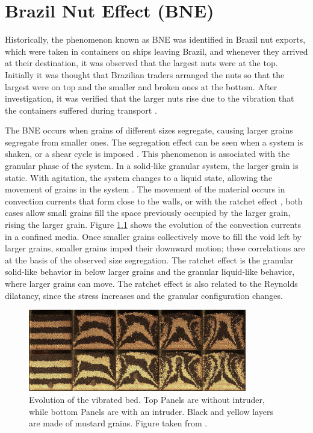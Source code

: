 \chapter{Brazil Nut Effect (BNE)}
\label{chap:BNE}
    Historically, the phenomenon known as BNE was identified in Brazil nut exports, which were taken in containers on ships leaving Brazil, and whenever they arrived at their destination, it was observed that the largest nuts were at the top. Initially it was thought that Brazilian traders arranged the nuts so that the largest were on top and the smaller and broken ones at the bottom. After investigation, it was verified that the larger nuts rise due to the vibration that the containers suffered during transport \cite{Caio-Tese}. 

    The BNE occurs when grains of different sizes segregate, causing larger grains segregate from smaller ones. The segregation effect can be seen when a system is shaken, or a shear cycle is imposed \cite{Granular_Physics}. This phenomenon is associated with the granular phase of the system. In a solid-like granular system, the larger grain is static. With agitation, the system changes to a liquid state, allowing the movement of grains in the system \cite{Why_the_Brazil_nuts_are_on_top}. The movement of the material occurs in convection currents that form close to the walls, or with the ratchet effect \cite{Effects_of_convection_and_friction_on_size_segregation_in_vibrated_granular_beds, Scaling_behavior_in_convection-driven_Brazil-nut_effect, Inertia_in_the_Brazil_nut_problem, The_water-enhance_Brazil_nut_effect}, both cases allow small grains fill the space previously occupied by the larger grain, rising the larger grain. Figure \ref{fig:BNE_hejmady_convection} shows the evolution of the convection currents in a confined media. Once smaller grains collectively move to fill the void left by larger grains, smaller grains imped their downward motion; these correlations are at the basis of the observed size segregation. The ratchet effect is the granular solid-like behavior in below larger grains and the granular liquid-like behavior, where larger grains can move. The ratchet effect is also related to the Reynolds dilatancy, since the stress increases and the granular configuration changes.

\begin{figure}[H]
    \centering
    \includegraphics[width=0.85\textwidth]{04-figuras/BNE_Hejmady_Convection.png}
    \caption[Granular convection in vibrated bed.]{Evolution of the vibrated bed. Top Panels are without intruder, while bottom Panels are with an intruder. Black and yellow layers are made of mustard grains. Figure taken from \cite{Scaling_behavior_in_convection-driven_Brazil-nut_effect}.}
    \label{fig:BNE_hejmady_convection}
\end{figure}

